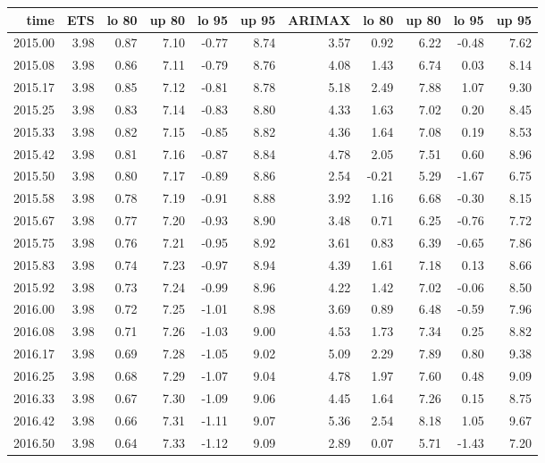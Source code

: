 \documentclass[10pt,a4paper]{article}\usepackage[]{graphicx}\usepackage[]{color}
\begin{document}
\begin{table}[ht]
\centering
\begin{tabular}{rrrrrrrrrrr}
  \hline
time & ETS  & lo 80 & up 80 & lo 95 & up 95 & ARIMAX  & lo 80 & up 80 & lo 95 & up 95 \\ 
  \hline
2015.00 & 3.98 & 0.87 & 7.10 & -0.77 & 8.74 & 3.57 & 0.92 & 6.22 & -0.48 & 7.62 \\ 
  2015.08 & 3.98 & 0.86 & 7.11 & -0.79 & 8.76 & 4.08 & 1.43 & 6.74 & 0.03 & 8.14 \\ 
  2015.17 & 3.98 & 0.85 & 7.12 & -0.81 & 8.78 & 5.18 & 2.49 & 7.88 & 1.07 & 9.30 \\ 
  2015.25 & 3.98 & 0.83 & 7.14 & -0.83 & 8.80 & 4.33 & 1.63 & 7.02 & 0.20 & 8.45 \\ 
  2015.33 & 3.98 & 0.82 & 7.15 & -0.85 & 8.82 & 4.36 & 1.64 & 7.08 & 0.19 & 8.53 \\ 
  2015.42 & 3.98 & 0.81 & 7.16 & -0.87 & 8.84 & 4.78 & 2.05 & 7.51 & 0.60 & 8.96 \\ 
  2015.50 & 3.98 & 0.80 & 7.17 & -0.89 & 8.86 & 2.54 & -0.21 & 5.29 & -1.67 & 6.75 \\ 
  2015.58 & 3.98 & 0.78 & 7.19 & -0.91 & 8.88 & 3.92 & 1.16 & 6.68 & -0.30 & 8.15 \\ 
  2015.67 & 3.98 & 0.77 & 7.20 & -0.93 & 8.90 & 3.48 & 0.71 & 6.25 & -0.76 & 7.72 \\ 
  2015.75 & 3.98 & 0.76 & 7.21 & -0.95 & 8.92 & 3.61 & 0.83 & 6.39 & -0.65 & 7.86 \\ 
  2015.83 & 3.98 & 0.74 & 7.23 & -0.97 & 8.94 & 4.39 & 1.61 & 7.18 & 0.13 & 8.66 \\ 
  2015.92 & 3.98 & 0.73 & 7.24 & -0.99 & 8.96 & 4.22 & 1.42 & 7.02 & -0.06 & 8.50 \\ 
  2016.00 & 3.98 & 0.72 & 7.25 & -1.01 & 8.98 & 3.69 & 0.89 & 6.48 & -0.59 & 7.96 \\ 
  2016.08 & 3.98 & 0.71 & 7.26 & -1.03 & 9.00 & 4.53 & 1.73 & 7.34 & 0.25 & 8.82 \\ 
  2016.17 & 3.98 & 0.69 & 7.28 & -1.05 & 9.02 & 5.09 & 2.29 & 7.89 & 0.80 & 9.38 \\ 
  2016.25 & 3.98 & 0.68 & 7.29 & -1.07 & 9.04 & 4.78 & 1.97 & 7.60 & 0.48 & 9.09 \\ 
  2016.33 & 3.98 & 0.67 & 7.30 & -1.09 & 9.06 & 4.45 & 1.64 & 7.26 & 0.15 & 8.75 \\ 
  2016.42 & 3.98 & 0.66 & 7.31 & -1.11 & 9.07 & 5.36 & 2.54 & 8.18 & 1.05 & 9.67 \\ 
  2016.50 & 3.98 & 0.64 & 7.33 & -1.12 & 9.09 & 2.89 & 0.07 & 5.71 & -1.43 & 7.20 \\ 

\end{tabular}
\end{table}
\end{document}

